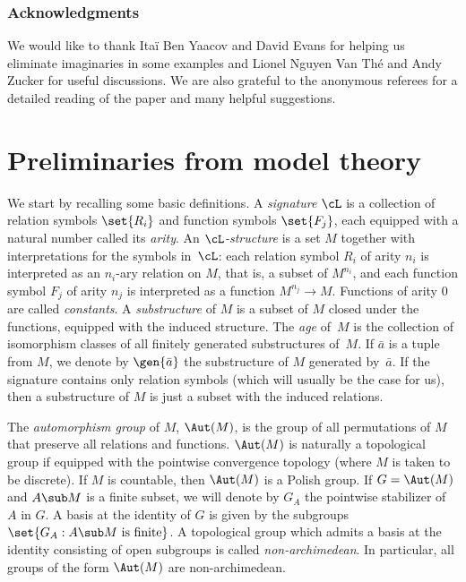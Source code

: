 \subsubsection*{Acknowledgments} We would like to thank Itaï Ben Yaacov and David Evans for helping us eliminate imaginaries in some examples and Lionel Nguyen Van Thé and Andy Zucker for useful discussions. We are also grateful to the anonymous referees for a detailed reading of the paper and many helpful suggestions.


\section{Preliminaries from model theory}
\label{sec:prel-from-model}

We start by recalling some basic definitions. A \emph{signature} $\cL$ is a collection of relation symbols $\set{R_i}$ and function symbols $\set{F_j}$, each equipped with a natural number called its \emph{arity}. An \emph{$\cL$-structure} is a set $M$ together with interpretations for the symbols in~$\cL$: each relation symbol $R_i$ of arity $n_i$ is interpreted as an $n_i$-ary relation on $M$, that is, a subset of $M^{n_i}$, and each function symbol $F_j$ of arity $n_j$ is interpreted as a function $M^{n_j} \to M$. Functions of arity $0$ are called \emph{constants}. A \emph{substructure} of $M$ is a subset of $M$ closed under the functions, equipped with the induced structure. The \emph{age} of~$M$ is the collection of isomorphism classes of all finitely generated substructures of~$M$. If $\bar a$ is a tuple from $M$, we denote by $\gen{\bar a}$ the substructure of $M$ generated by~$\bar a$. If the signature contains only relation symbols (which will usually be the case for us), then a substructure of $M$ is just a subset with the induced relations.

The \emph{automorphism group} of $M$, $\Aut(M)$, is the group of all permutations of $M$ that preserve all relations and functions. $\Aut(M)$ is naturally a topological group if equipped with the pointwise convergence topology (where $M$ is taken to be discrete). If $M$ is countable, then $\Aut(M)$ is a Polish group. If $G = \Aut(M)$ and $A \sub M$ is a finite subset, we will denote by $G_{A}$ the pointwise stabilizer of $A$ in $G$. A basis at the identity of $G$ is given by the subgroups $\set{G_A : A \sub M \text{ is finite}}$. A topological group which admits a basis at the identity consisting of open subgroups is called \emph{non-archimedean}. In particular, all groups of the form $\Aut(M)$ are non-archimedean.

